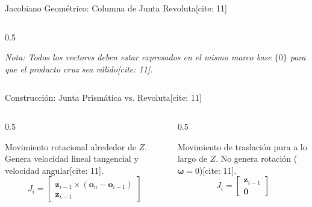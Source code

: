 \documentclass[aspectratio=169, xcolor={table,xcdraw}]{beamer}
\begin{document}
\begin{frame}{Jacobiano Geométrico: Columna de Junta Revoluta[cite: 11]}
\begin{columns}[T]
\begin{column}{0.5\textwidth}
            
            \small \textit{Nota: Todos los vectores deben estar expresados en el mismo marco base $\{0\}$ para que el producto cruz sea válido[cite: 11].}
        \end{column}
    \end{columns}
\end{frame}

\begin{frame}{Construcción: Junta Prismática vs. Revoluta[cite: 11]}
    \begin{columns}[T]
        \begin{column}{0.5\textwidth}
            \begin{tcolorbox}[colback=ucbblue!5, colframe=ucbblue, title=Junta Revoluta]
                Movimiento rotacional alrededor de $Z$. Genera velocidad lineal tangencial y velocidad angular[cite: 11].
                \begin{equation*}
                    \boxed{
                    J_i = \begin{bmatrix}
                    \mathbf{z}_{i-1} \times (\mathbf{o}_n - \mathbf{o}_{i-1}) \\
                    \mathbf{z}_{i-1}
                    \end{bmatrix}
                    }
                \end{equation*}
            \end{tcolorbox}
        \end{column}
        \begin{column}{0.5\textwidth}
            \begin{tcolorbox}[colback=red!5, colframe=red!70!black, title=Junta Prismática]
                Movimiento de traslación pura a lo largo de $Z$. No genera rotación ($\boldsymbol{\omega} = 0$)[cite: 11].
                \begin{equation*}
                    \boxed{
                    J_i = \begin{bmatrix}
                    \mathbf{z}_{i-1} \\
                    \mathbf{0}
                    \end{bmatrix}
                    }
                \end{equation*}
            \end{tcolorbox}
        \end{column}
    \end{columns}
\end{frame}
\end{document}
